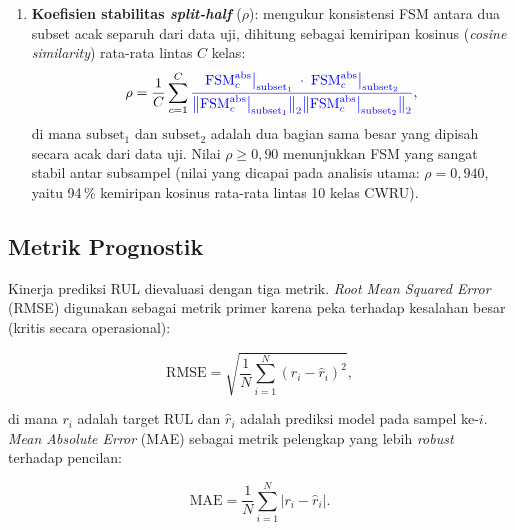 \begin{enumerate}
  \item \textbf{Koefisien stabilitas \emph{split-half}} ($\rho$): mengukur
        konsistensi FSM antara dua subset acak separuh dari data uji,
        {\color{blue}dihitung sebagai kemiripan kosinus (\emph{cosine
        similarity}) rata-rata lintas $C$ kelas}:%
        \begin{equation}\label{eq:bab3_stability}
          \rho = \frac{1}{C} \sum_{c=1}^{C}
            {\color{blue}\frac{\mathrm{FSM}_c^{\rm abs}\big|_{\rm subset_1}
                                    \;\cdot\;\mathrm{FSM}_c^{\rm abs}\big|_{\rm subset_2}}
                            {\bigl\|\mathrm{FSM}_c^{\rm abs}\big|_{\rm subset_1}\bigr\|_2
                             \bigl\|\mathrm{FSM}_c^{\rm abs}\big|_{\rm subset_2}\bigr\|_2}},
        \end{equation}
        di mana $\mathrm{subset}_1$ dan $\mathrm{subset}_2$ adalah dua bagian
        sama besar yang dipisah secara acak dari data uji. Nilai $\rho \geq 0{,}90$
        menunjukkan FSM yang sangat stabil antar subsampel
        {\color{blue}(nilai yang dicapai pada analisis utama: $\rho = 0{,}940$,
        yaitu 94\,\% kemiripan kosinus rata-rata lintas 10 kelas CWRU).}%
\end{enumerate}

\subsection{Metrik Prognostik}
\label{subsec:bab3_metrik_prognostik}

Kinerja prediksi RUL dievaluasi dengan tiga metrik. \emph{Root Mean Squared
Error} (RMSE) digunakan sebagai metrik primer karena peka terhadap kesalahan
besar (kritis secara operasional):

\begin{equation}\label{eq:bab3_rmse}
  \text{RMSE} = \sqrt{\frac{1}{N} \sum_{i=1}^{N} (r_i - \hat{r}_i)^2},
\end{equation}

\noindent di mana $r_i$ adalah target RUL dan $\hat{r}_i$ adalah prediksi
model pada sampel ke-$i$. \emph{Mean Absolute Error} (MAE) sebagai metrik
pelengkap yang lebih \emph{robust} terhadap pencilan:

\begin{equation}\label{eq:bab3_mae}
  \text{MAE} = \frac{1}{N} \sum_{i=1}^{N} |r_i - \hat{r}_i|.
\end{equation}

